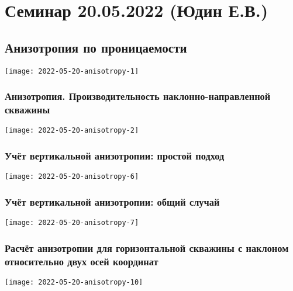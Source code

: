 \documentclass[main.tex]{subfiles}
\begin{document}
\section{Семинар 20.05.2022 (Юдин Е.В.)}

\subsection{Анизотропия по проницаемости}
\texttt{[image: 2022-05-20-anisotropy-1]}

\subsubsection{Анизотропия. Производительность наклонно-направленной скважины}
\texttt{[image: 2022-05-20-anisotropy-2]}




\subsubsection{Учёт вертикальной анизотропии: простой подход}
\texttt{[image: 2022-05-20-anisotropy-6]}

\subsubsection{Учёт вертикальной анизотропии: общий случай}
\texttt{[image: 2022-05-20-anisotropy-7]}



\subsubsection{Расчёт анизотропии для горизонтальной скважины с наклоном относительно двух осей координат}
\texttt{[image: 2022-05-20-anisotropy-10]}


\end{document}
